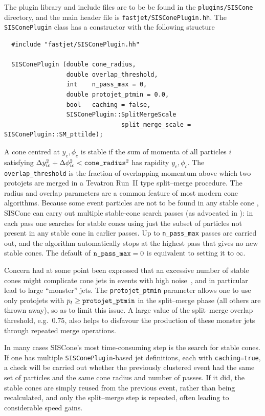 \documentclass[12pt,a4]{article}
\begin{document}
The plugin library and include files are to be be found in the
\verb:plugins/SISCone: directory, and the main header file is
\verb:fastjet/SISConePlugin.hh:. The \verb:SISConePlugin: class has a
constructor with the following structure
\begin{lstlisting}
  #include "fastjet/SISConePlugin.hh"

  SISConePlugin (double cone_radius,
                 double overlap_threshold,
                 int    n_pass_max = 0,
                 double protojet_ptmin = 0.0, 
                 bool   caching = false,
                 SISConePlugin::SplitMergeScale   
                                split_merge_scale = SISConePlugin::SM_pttilde);
\end{lstlisting}
A cone centred at $y_c,\phi_c$ is stable if the sum of momenta of all
particles $i$ satisfying $\Delta y_{ic}^2 + \Delta \phi_{ic}^2 <
\verb:cone_radius:^2$ has rapidity $y_c,\phi_c$.
%
The \verb:overlap_threshold: is the fraction of overlapping momentum
above which two protojets are merged in a Tevatron Run~II type
\cite{RunII-jet-physics} split--merge procedure.
The
radius and overlap parameters are a common feature of most modern cone
algorithms. Because some event particles are not to be found in any
stable cone \cite{EHT}, SISCone can carry out multiple stable-cone
search passes (as advocated in \cite{TeV4LHC}): in each pass one
searches for stable cones using just the subset of particles not
present in any stable cone in earlier passes. Up to \verb:n_pass_max:
passes are carried out, and the algorithm automatically stops at the
highest pass that gives no new stable cones. The default of
$\verb:n_pass_max: = 0$ is equivalent to setting it to $\infty$.

Concern had at some point been expressed that an excessive number of
stable cones might complicate cone jets in events with high
noise~\cite{RunII-jet-physics}, and in particular lead to large
``monster'' jets.
%
The \verb:protojet_ptmin: parameter allows one to use only protojets
with $p_t \ge \verb:protojet_ptmin:$ in the split--merge phase (all
others are thrown away), so as to limit this issue.
%
A large value of the split--merge overlap threshold, e.g.\ $0.75$,
also helps to disfavour the production of these monster jets through
repeated merge operations.

In many cases SISCone's most time-consuming step is the search for
stable cones. If one has multiple \verb:SISConePlugin:-based jet
definitions, each with \verb:caching=true:, a check will be carried
out whether the previously clustered event had the same set of
particles and the same cone radius and number of passes. If it did,
the stable cones are simply reused from the previous event, rather
than being recalculated, and only the split--merge step is repeated,
often leading to considerable speed gains.
\end{document}
